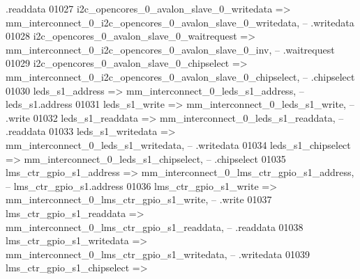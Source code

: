 \begin{DoxyCode}
{       .readdata}
01027             i2c\_opencores\_0\_avalon\_slave\_0\_writedata    => 
      mm_interconnect_0_i2c_opencores_0_avalon_slave_0_writedata,\textcolor{keyword}{  --                                     
       .writedata}
01028             i2c\_opencores\_0\_avalon\_slave\_0\_waitrequest  => 
      mm_interconnect_0_i2c_opencores_0_avalon_slave_0_inv,\textcolor{keyword}{        --                                     
       .waitrequest}
01029             i2c\_opencores\_0\_avalon\_slave\_0\_chipselect   => 
      mm_interconnect_0_i2c_opencores_0_avalon_slave_0_chipselect,\textcolor{keyword}{ --                                     
       .chipselect}
01030             leds\_s1\_address                             => 
      mm_interconnect_0_leds_s1_address,\textcolor{keyword}{                           --                              
       leds\_s1.address}
01031             leds\_s1\_write                               => 
      mm_interconnect_0_leds_s1_write,\textcolor{keyword}{                             --                                      .write}
01032             leds\_s1\_readdata                            => 
      mm_interconnect_0_leds_s1_readdata,\textcolor{keyword}{                          --                                     
       .readdata}
01033             leds\_s1\_writedata                           => 
      mm_interconnect_0_leds_s1_writedata,\textcolor{keyword}{                         --                                     
       .writedata}
01034             leds\_s1\_chipselect                          => 
      mm_interconnect_0_leds_s1_chipselect,\textcolor{keyword}{                        --                                     
       .chipselect}
01035             lms\_ctr\_gpio\_s1\_address                     => 
      mm_interconnect_0_lms_ctr_gpio_s1_address,\textcolor{keyword}{                   --                      
       lms\_ctr\_gpio\_s1.address}
01036             lms\_ctr\_gpio\_s1\_write                       => 
      mm_interconnect_0_lms_ctr_gpio_s1_write,\textcolor{keyword}{                     --                                      .write}
01037             lms\_ctr\_gpio\_s1\_readdata                    => 
      mm_interconnect_0_lms_ctr_gpio_s1_readdata,\textcolor{keyword}{                  --                                     
       .readdata}
01038             lms\_ctr\_gpio\_s1\_writedata                   => 
      mm_interconnect_0_lms_ctr_gpio_s1_writedata,\textcolor{keyword}{                 --                                     
       .writedata}
01039             lms\_ctr\_gpio\_s1\_chipselect                  => 

\end{DoxyCode}
